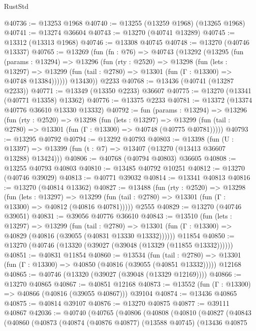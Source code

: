 \begin{lexlean}{RustStd}
\begin{coremodule}
@40736 := @13253 @1968
@40740 := @13255 (@13259 @1968) (@13265 @1968)
@40741 := @13274 @36604
@40743 := @13270 (@40741 @13289)
@40745 := @13312 (@13313 @1968)
@40746 := @13308 @40745
@40748 := @13270 (@40746 @13337)
@40765 := @13269
    (fun (fn : @76) =>
    @40743
      (@13292
        (@13295
          (fun (params : @13294) =>
          @13296
            (fun (rty : @2520) =>
            @13298
              (fun (lets : @13297) =>
              @13299 (fun (tail : @2780) => @13301 (fun (Γ : @13300) => @40748 @13384))))))
        @13430))
    @2233
@40768 := @13436 (@40741 (@13287 @2233))
@40771 := @13349 (@13350 @2233) @36607
@40775 := @13270 (@13341 (@40771 @13358) @13362)
@40776 := @13375 @2233
@40781 := @13372 (@13374 @40776 @36610 @13330 @13332)
@40792 := fun (params : @13294) =>
  @13296
    (fun (rty : @2520) =>
    @13298
      (fun (lets : @13297) =>
      @13299 (fun (tail : @2780) => @13301 (fun (Γ : @13300) => @40748 (@40775 @40781)))))
@40793 := @13295 @40792
@40794 := @13292 @40793
@40803 := @13398
    (fun (U : @13397) => @13399 (fun (t : @7) => @13407 (@13270 (@13413 @36607 @13288) @13424)))
@40806 := @40768 (@40794 @40803) @36605
@40808 := @13255 @40793 @40803
@40810 := @13485 @40792 @10251
@40812 := @13270 (@40746 @39029)
@40813 := @40771 @39032
@40814 := @13341 @40813
@40816 := @13270 (@40814 @13362)
@40827 := @13488
    (fun (rty : @2520) =>
    @13298
      (fun (lets : @13297) =>
      @13299 (fun (tail : @2780) => @13301 (fun (Γ : @13300) => @40812 (@40816 @40781)))))
    @2555
@40829 := @13270 (@40746 @39051)
@40831 := @39056 @40776 @36610
@40843 := @13510
    (fun (lets : @13297) =>
    @13299
      (fun (tail : @2780) =>
      @13301 (fun (Γ : @13300) => @40829 (@40816 (@39055 (@40831 @13330 @13332))))))
    @11854
@40850 := @13270 (@40746 (@13320 (@39027 (@39048 (@13329 (@11855 @13332))))))
@40851 := @40831 @11854
@40860 := @13534
    (fun (tail : @2780) => @13301 (fun (Γ : @13300) => @40850 (@40816 (@39055 (@40851 @13332)))))
    @12168
@40865 := @40746 (@13320 (@39027 (@39048 (@13329 @12169))))
@40866 := @13270 @40865
@40867 := @40851 @12168
@40873 := @13552 (fun (Γ : @13300) => @40866 (@40816 (@39055 @40867))) @39104
@40874 := @13436 @40865
@40875 := @40814 @39107
@40876 := @13270 @40875
@40877 := @39111 @40867
@42036 := @40740
    (@40765
      (@40806
        (@40808
          (@40810
            (@40827
              (@40843
                (@40860
                  (@40873
                    (@40874
                      (@40876 @40877)
                      (@13588 @40745)
                      (@13436
                        @40875

\end{coremodule}
\end{lexlean}
